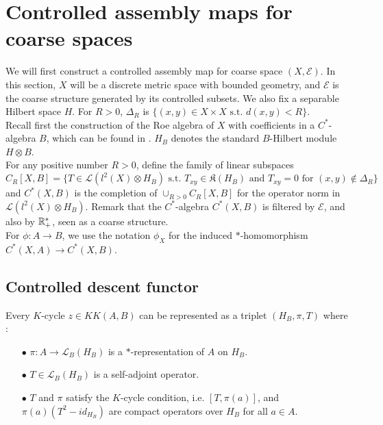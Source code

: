 \section{Controlled assembly maps for coarse spaces}

We will first construct a controlled assembly map for coarse space $(X,\mathcal E)$. In this section, $X$ will be a discrete metric space with bounded geometry, and $\mathcal E$ is the coarse structure generated by its controlled subsets. We also fix a separable Hilbert space $H$. For $R>0$, $\Delta_R$ is $\{(x,y)\in X\times X\text{ s.t. }d(x,y)<R\}$.\\

Recall first the construction of the Roe algebra of $X$ with coefficients in a $C^*$-algebra $B$, which can be found in \cite{SkTuYu}. $H_B$ denotes the standard $B$-Hilbert module $H\otimes B$.\\

For any positive number $R>0$, define the family of linear subspaces 
\[C_R[X,B]=\{T\in \mathcal L(l^2(X)\otimes H_B) \text{ s.t. } T_{xy}\in \mathfrak K(H_B) \text{ and }T_{xy}=0 \text{ for }(x,y)\not\in \Delta_R  \}\]
and $C^*(X,B)$ is the completion of $\cup_{R>0} C_R[X,B]$ for the operator norm in $\mathcal L(l^2(X)\otimes H_B) $. Remark that the $C^*$-algebra $C^*(X,B)$ is filtered by $\mathcal E$, and also by $\mathbb R_+^*$, seen as a coarse structure.\\

For $\phi : A\rightarrow B$, we use the notation $\phi_X $ for the induced $*$-homomorphism $C^*(X,A)\rightarrow C^*(X,B)$.

\subsection{Controlled descent functor}

Every $K$-cycle $z\in KK(A,B)$ can be represented as a triplet $(H_B, \pi, T)$ where :
\begin{itemize}
\item[$\bullet$]$\pi : A\rightarrow \mathcal L_B(H_B)$ is a $*$-representation of $A$ on $H_B$.
\item[$\bullet$]$T\in \mathcal L_B(H_B)$ is a self-adjoint operator.
\item[$\bullet$] $T$ and $\pi$ satisfy the $K$-cycle condition, i.e. $[T,\pi(a)]$, and $\pi(a)(T^2-id_{H_B})$ are compact operators over $H_B$ for all $a\in A$.\\
\end{itemize}

